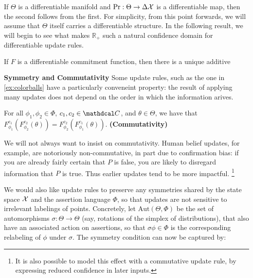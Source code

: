 \documentclass{article}
\def\cofunc{commitment function}
\def\confdom{\mathdcal C}
\def\Rplus{\mathbb R_+}
\begin{document}
If $\Theta$ is a differentiable manifold and $\Pr: \Theta \to \Delta\mathcal X$ is a differentiable map, then the second follows from the first. 
For simplicity, from this point forwards, we will assume that $\Theta$ itself carries a differentiable structure.
In the following result, we will begin to see what makes $\Rplus$ such a natural confidence domain for differentiable update rules.

\begin{prop}
    If $F$ is a differentiable \cofunc, then there is a unique additive     
\end{prop}


\textbf{Symmetry and Commutativity}
Some update rules, such as the one in \cref{ex:colorballs} have a particularly conveneint property: the result of applying many updates does not depend on the order in which the information arives.

\begin{CFaxioms}
    \item For all $\phi_1, \phi_2 \in \Phi$,
     $c_1, c_2 \in \confdom$, and
    $\theta \in \Theta$,
    we have that
    $
        F^{c_1}_{\phi_1} ( F^{c_2}_{\phi_2}(\theta)) =
            F^{c_2}_{\phi_2} ( F^{c_1}_{\phi_1}(\theta)).
    $
    \hfill\textbf{(Commutativity)} \label{ax:commute}
\end{CFaxioms}

We will not always want to insist on commutativity. Human belief updates, for example, are notoriously non-commutative, in part due to confirmation bias:
if you are already fairly certain that $P$ is false, you are likely to disregard
information that $P$ is true. Thus earlier updates tend to be more impactful.%
\footnote{
    It is also possible to model this effect with a commutative update rule,
    by expressing reduced confidence in later inputs.
}


We would also like update rules to preserve any symmetries shared by the state space $\mathcal X$ and the assertion language $\Phi$, so that updates are not sensitive to irrelevant labelings of points.
Concretely, let $\mathrm{Aut}(\Theta, \Phi)$ be the set of automorphisms $\sigma : \Theta \to \Theta$ (say, rotations of the simplex of distributions), that also have an associated action on assertions, so that $\sigma\phi \in \Phi$ is the corresponding relabeling of $\phi$ under $\sigma$.  The symmetry condition can now be captured by:
\end{document}
